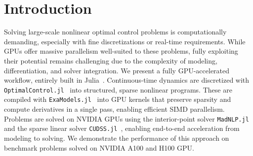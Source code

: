 


\section{Introduction}

Solving large-scale nonlinear optimal control problems is computationally demanding, especially with fine discretizations or real-time requirements.  
While GPUs offer massive parallelism well-suited to these problems, fully exploiting their potential remains challenging due to the complexity of modeling, differentiation, and solver integration.
%
We present a fully GPU-accelerated workflow, entirely built in Julia~\cite{bezanson2017julia}.
Continuous-time dynamics are discretized with \texttt{OptimalControl.jl}~\cite{Caillau_OptimalControl_jl_a_Julia} into structured, sparse nonlinear programs.  
These are compiled with \texttt{ExaModels.jl}~\cite{shin2024accelerating} into GPU kernels that preserve sparsity and compute derivatives in a single pass, enabling efficient SIMD parallelism.
%
Problems are solved on NVIDIA GPUs using the interior-point solver \texttt{MadNLP.jl}~\cite{shin2021graph} and the sparse linear solver \texttt{CUDSS.jl}~\cite{Montoison_CUDSS_jl_Julia_interface}, enabling end-to-end acceleration from modeling to solving.
%
We demonstrate the performance of this approach on benchmark problems solved on NVIDIA A100 and H100 GPU.



